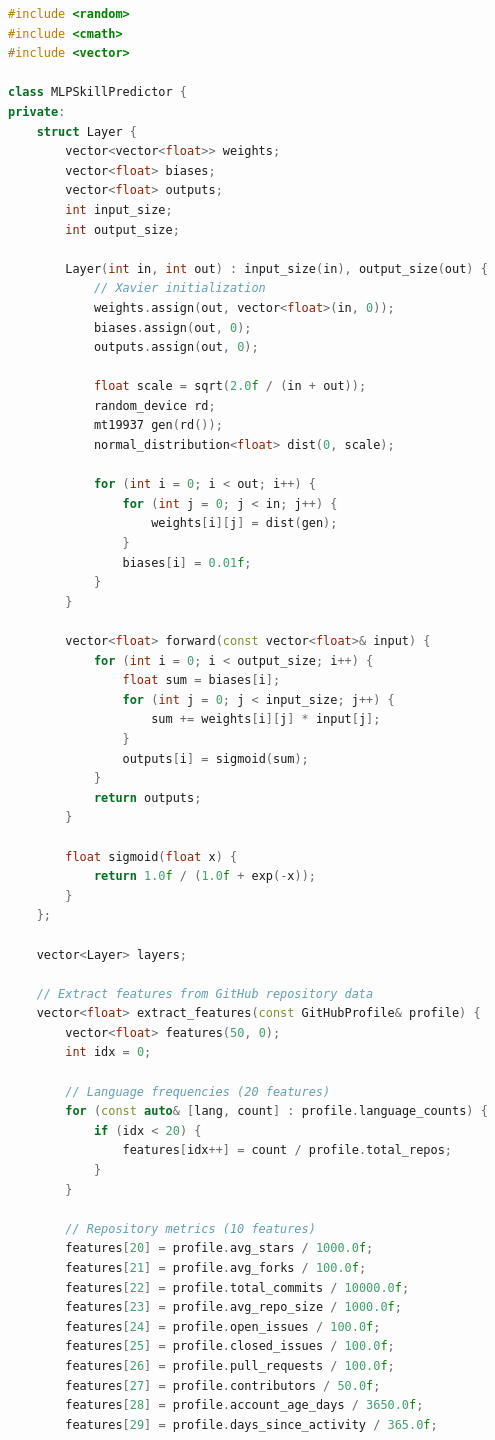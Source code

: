 \documentclass[12pt,a4paper]{article}
\begin{document}
\begin{lstlisting}[language=C++, caption=MLP Neural Network for Skill Prediction]
#include <random>
#include <cmath>
#include <vector>

class MLPSkillPredictor {
private:
    struct Layer {
        vector<vector<float>> weights;
        vector<float> biases;
        vector<float> outputs;
        int input_size;
        int output_size;
        
        Layer(int in, int out) : input_size(in), output_size(out) {
            // Xavier initialization
            weights.assign(out, vector<float>(in, 0));
            biases.assign(out, 0);
            outputs.assign(out, 0);
            
            float scale = sqrt(2.0f / (in + out));
            random_device rd;
            mt19937 gen(rd());
            normal_distribution<float> dist(0, scale);
            
            for (int i = 0; i < out; i++) {
                for (int j = 0; j < in; j++) {
                    weights[i][j] = dist(gen);
                }
                biases[i] = 0.01f;
            }
        }
        
        vector<float> forward(const vector<float>& input) {
            for (int i = 0; i < output_size; i++) {
                float sum = biases[i];
                for (int j = 0; j < input_size; j++) {
                    sum += weights[i][j] * input[j];
                }
                outputs[i] = sigmoid(sum);
            }
            return outputs;
        }
        
        float sigmoid(float x) {
            return 1.0f / (1.0f + exp(-x));
        }
    };
    
    vector<Layer> layers;
    
    // Extract features from GitHub repository data
    vector<float> extract_features(const GitHubProfile& profile) {
        vector<float> features(50, 0);
        int idx = 0;
        
        // Language frequencies (20 features)
        for (const auto& [lang, count] : profile.language_counts) {
            if (idx < 20) {
                features[idx++] = count / profile.total_repos;
            }
        }
        
        // Repository metrics (10 features)
        features[20] = profile.avg_stars / 1000.0f;
        features[21] = profile.avg_forks / 100.0f;
        features[22] = profile.total_commits / 10000.0f;
        features[23] = profile.avg_repo_size / 1000.0f;
        features[24] = profile.open_issues / 100.0f;
        features[25] = profile.closed_issues / 100.0f;
        features[26] = profile.pull_requests / 100.0f;
        features[27] = profile.contributors / 50.0f;
        features[28] = profile.account_age_days / 3650.0f;
        features[29] = profile.days_since_activity / 365.0f;
        

\end{lstlisting}
\end{document}
